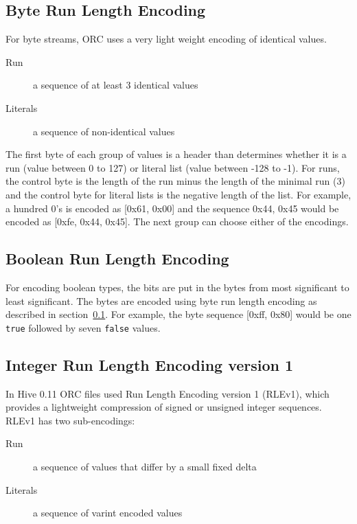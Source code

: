 \documentclass{article}
\begin{document}
\subsection{Byte Run Length Encoding}
\label{byte-rle}

For byte streams, ORC uses a very light weight encoding of identical
values.

\begin{description}
\item[Run] a sequence of at least 3 identical values
\item[Literals] a sequence of non-identical values
\end{description}

The first byte of each group of values is a header than determines
whether it is a run (value between 0 to 127) or literal list (value
between -128 to -1). For runs, the control byte is the length of the
run minus the length of the minimal run (3) and the control byte for
literal lists is the negative length of the list. For example, a
hundred 0's is encoded as [0x61, 0x00] and the sequence 0x44, 0x45
would be encoded as [0xfe, 0x44, 0x45]. The next group can choose
either of the encodings.

\subsection{Boolean Run Length Encoding}

For encoding boolean types, the bits are put in the bytes from most
significant to least significant. The bytes are encoded using byte run
length encoding as described in section~\ref{byte-rle}. For example,
the byte sequence [0xff, 0x80] would be one \verb+true+ followed by
seven \verb+false+ values.

\subsection{Integer Run Length Encoding version 1}

In Hive 0.11 ORC files used Run Length Encoding version 1 (RLEv1),
which provides a lightweight compression of signed or unsigned integer
sequences. RLEv1 has two sub-encodings:

\begin{description}
\item[Run] a sequence of values that differ by a small fixed delta
\item[Literals] a sequence of varint encoded values
\end{description}
\end{document}
